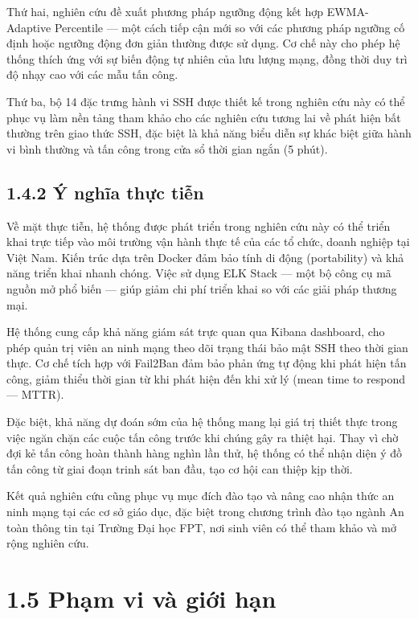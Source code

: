 \documentclass[
  a4paper]{report}
\begin{document}
Thứ hai, nghiên cứu đề xuất phương pháp ngưỡng động kết hợp
EWMA-Adaptive Percentile --- một cách tiếp cận mới so với các phương
pháp ngưỡng cố định hoặc ngưỡng động đơn giản thường được sử dụng. Cơ
chế này cho phép hệ thống thích ứng với sự biến động tự nhiên của lưu
lượng mạng, đồng thời duy trì độ nhạy cao với các mẫu tấn công.

Thứ ba, bộ 14 đặc trưng hành vi SSH được thiết kế trong nghiên cứu này
có thể phục vụ làm nền tảng tham khảo cho các nghiên cứu tương lai về
phát hiện bất thường trên giao thức SSH, đặc biệt là khả năng biểu diễn
sự khác biệt giữa hành vi bình thường và tấn công trong cửa sổ thời gian
ngắn (5 phút).

\subsection{1.4.2 Ý nghĩa thực
tiễn}\label{uxfd-nghux129a-thux1ef1c-tiux1ec5n}

Về mặt thực tiễn, hệ thống được phát triển trong nghiên cứu này có thể
triển khai trực tiếp vào môi trường vận hành thực tế của các tổ chức,
doanh nghiệp tại Việt Nam. Kiến trúc dựa trên Docker đảm bảo tính di
động (portability) và khả năng triển khai nhanh chóng. Việc sử dụng ELK
Stack --- một bộ công cụ mã nguồn mở phổ biến --- giúp giảm chi phí
triển khai so với các giải pháp thương mại.

Hệ thống cung cấp khả năng giám sát trực quan qua Kibana dashboard, cho
phép quản trị viên an ninh mạng theo dõi trạng thái bảo mật SSH theo
thời gian thực. Cơ chế tích hợp với Fail2Ban đảm bảo phản ứng tự động
khi phát hiện tấn công, giảm thiểu thời gian từ khi phát hiện đến khi xử
lý (mean time to respond --- MTTR).

Đặc biệt, khả năng dự đoán sớm của hệ thống mang lại giá trị thiết thực
trong việc ngăn chặn các cuộc tấn công trước khi chúng gây ra thiệt hại.
Thay vì chờ đợi kẻ tấn công hoàn thành hàng nghìn lần thử, hệ thống có
thể nhận diện ý đồ tấn công từ giai đoạn trinh sát ban đầu, tạo cơ hội
can thiệp kịp thời.

Kết quả nghiên cứu cũng phục vụ mục đích đào tạo và nâng cao nhận thức
an ninh mạng tại các cơ sở giáo dục, đặc biệt trong chương trình đào tạo
ngành An toàn thông tin tại Trường Đại học FPT, nơi sinh viên có thể
tham khảo và mở rộng nghiên cứu.

\section{1.5 Phạm vi và giới
hạn}\label{phux1ea1m-vi-vuxe0-giux1edbi-hux1ea1n}
\end{document}
